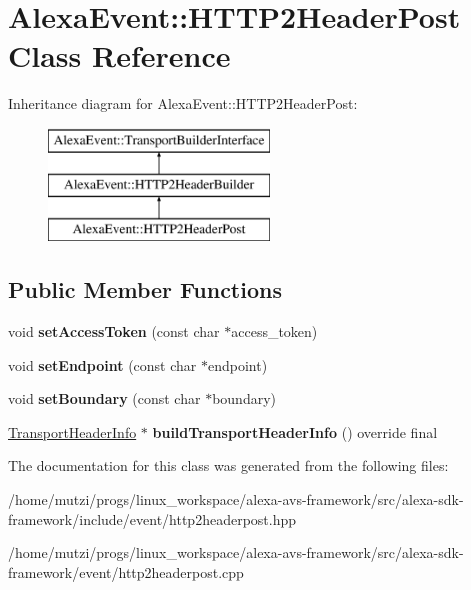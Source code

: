 \hypertarget{classAlexaEvent_1_1HTTP2HeaderPost}{}\section{Alexa\+Event\+:\+:H\+T\+T\+P2\+Header\+Post Class Reference}
\label{classAlexaEvent_1_1HTTP2HeaderPost}
Inheritance diagram for Alexa\+Event\+:\+:H\+T\+T\+P2\+Header\+Post\+:\begin{figure}[H]
\begin{center}
\leavevmode
\includegraphics[height=3.000000cm]{d6/ddd/classAlexaEvent_1_1HTTP2HeaderPost}
\end{center}
\end{figure}
\subsection*{Public Member Functions}
\begin{DoxyCompactItemize}
\item 
\mbox{\label{classAlexaEvent_1_1HTTP2HeaderPost_a54a88ff6e6b143c5cde364a6a8804d87}} 
void {\bfseries set\+Access\+Token} (const char $\ast$access\+\_\+token)
\item 
\mbox{\label{classAlexaEvent_1_1HTTP2HeaderPost_a2cea0b966af851f8a162217c81495839}} 
void {\bfseries set\+Endpoint} (const char $\ast$endpoint)
\item 
\mbox{\label{classAlexaEvent_1_1HTTP2HeaderPost_ab3788d3a374e93ac9232843d3fc1fde8}} 
void {\bfseries set\+Boundary} (const char $\ast$boundary)
\item 
\mbox{\label{classAlexaEvent_1_1HTTP2HeaderPost_af5cd287d4dc72ce2b63d22d906e513c0}} 
\hyperlink{classAlexaEvent_1_1TransportHeaderInfo}{Transport\+Header\+Info} $\ast$ {\bfseries build\+Transport\+Header\+Info} () override final
\end{DoxyCompactItemize}


The documentation for this class was generated from the following files\+:\begin{DoxyCompactItemize}
\item 
/home/mutzi/progs/linux\+\_\+workspace/alexa-\/avs-\/framework/src/alexa-\/sdk-\/framework/include/event/http2headerpost.\+hpp\item 
/home/mutzi/progs/linux\+\_\+workspace/alexa-\/avs-\/framework/src/alexa-\/sdk-\/framework/event/http2headerpost.\+cpp\end{DoxyCompactItemize}
